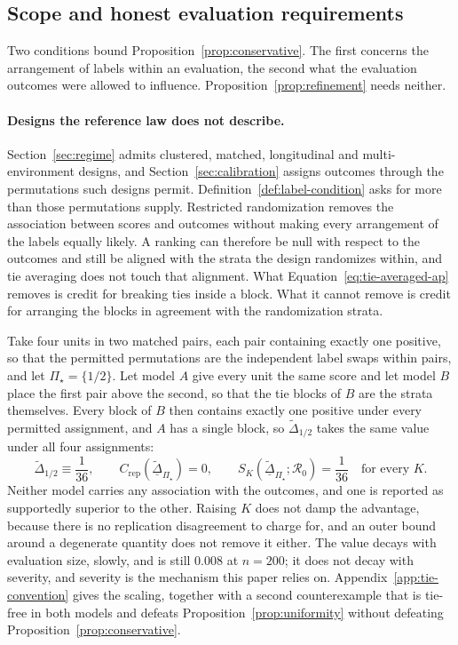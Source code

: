 \documentclass[11pt]{article}
\newcommand{\Regime}{\mathcal{R}}
\newcommand{\PSet}{\Pi_\star}
\newcommand{\Dta}{\widetilde{\Delta}}
\newcommand{\RobDta}{\underline{\widetilde{\Delta}}_{\PSet}}
\theoremstyle{remark}
\begin{document}
\subsection{Scope and honest evaluation requirements}
\label{sec:paired-scope}

Two conditions bound Proposition~\ref{prop:conservative}. The first concerns the arrangement of labels within an evaluation, the second what the evaluation outcomes were allowed to influence. Proposition~\ref{prop:refinement} needs neither.

\paragraph{Designs the reference law does not describe.}
Section~\ref{sec:regime} admits clustered, matched, longitudinal and multi-environment designs, and Section~\ref{sec:calibration} assigns outcomes through the permutations such designs permit. Definition~\ref{def:label-condition} asks for more than those permutations supply. Restricted randomization removes the association between scores and outcomes without making every arrangement of the labels equally likely. A ranking can therefore be null with respect to the outcomes and still be aligned with the strata the design randomizes within, and tie averaging does not touch that alignment. What Equation~\eqref{eq:tie-averaged-ap} removes is credit for breaking ties inside a block. What it cannot remove is credit for arranging the blocks in agreement with the randomization strata.

Take four units in two matched pairs, each pair containing exactly one positive, so that the permitted permutations are the independent label swaps within pairs, and let $\PSet=\{1/2\}$. Let model $A$ give every unit the same score and let model $B$ place the first pair above the second, so that the tie blocks of $B$ are the strata themselves. Every block of $B$ then contains exactly one positive under every permitted assignment, and $A$ has a single block, so $\Dta_{1/2}$ takes the same value under all four assignments:
\[
\Dta_{1/2}\equiv\frac{1}{36},
\qquad
C_{\mathrm{rep}}(\RobDta)=0,
\qquad
S_K(\RobDta;\Regime_0)=\frac{1}{36}
\quad\text{for every }K .
\]
Neither model carries any association with the outcomes, and one is reported as supportedly superior to the other. Raising $K$ does not damp the advantage, because there is no replication disagreement to charge for, and an outer bound around a degenerate quantity does not remove it either. The value decays with evaluation size, slowly, and is still $0.008$ at $n=200$; it does not decay with severity, and severity is the mechanism this paper relies on. Appendix~\ref{app:tie-convention} gives the scaling, together with a second counterexample that is tie-free in both models and defeats Proposition~\ref{prop:uniformity} without defeating Proposition~\ref{prop:conservative}.
\end{document}
